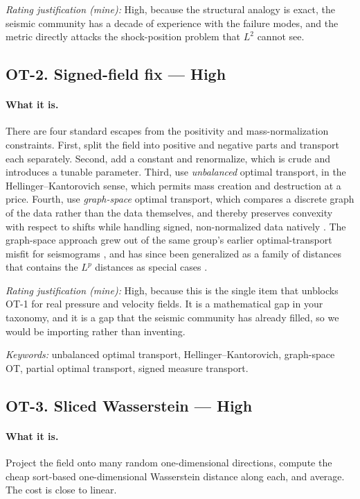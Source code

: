 \documentclass[11pt]{article}
\newcommand{\High}{\textbf{High}}
\newcommand{\keywords}[1]{\par\smallskip\noindent\textit{Keywords:} #1}
\newcommand{\rating}[1]{\par\smallskip\noindent\textit{Rating justification (mine):} #1}
\begin{document}
\rating{High, because the structural analogy is exact, the seismic community has a decade of
experience with the failure modes, and the metric directly attacks the shock-position
problem that $L^2$ cannot see.}

\subsection{OT-2. Signed-field fix --- \High{}}

\paragraph{What it is.} There are four standard escapes from the positivity and
mass-normalization constraints. First, split the field into positive and negative parts and
transport each separately. Second, add a constant and renormalize, which is crude and
introduces a tunable parameter. Third, use \emph{unbalanced} optimal transport, in the
Hellinger--Kantorovich sense, which permits mass creation and destruction at a price.
Fourth, use \emph{graph-space} optimal transport, which compares a discrete graph of the
data rather than the data themselves, and thereby preserves convexity with respect to
shifts while handling signed, non-normalized data natively \cite{metivier2018geophysics}.
The graph-space approach grew out of the same group's earlier optimal-transport misfit for
seismograms \cite{metivier2016gji}, and has since been generalized as a family of distances
that contains the $L^p$ distances as special cases \cite{metivier2019ip}.

\rating{High, because this is the single item that unblocks OT-1 for real pressure and
velocity fields. It is a mathematical gap in your taxonomy, and it is a gap that the
seismic community has already filled, so we would be importing rather than inventing.}

\keywords{unbalanced optimal transport, Hellinger--Kantorovich, graph-space OT, partial
optimal transport, signed measure transport.}

\subsection{OT-3. Sliced Wasserstein --- \High{}}

\paragraph{What it is.} Project the field onto many random one-dimensional directions,
compute the cheap sort-based one-dimensional Wasserstein distance along each, and average.
The cost is close to linear.
\end{document}
